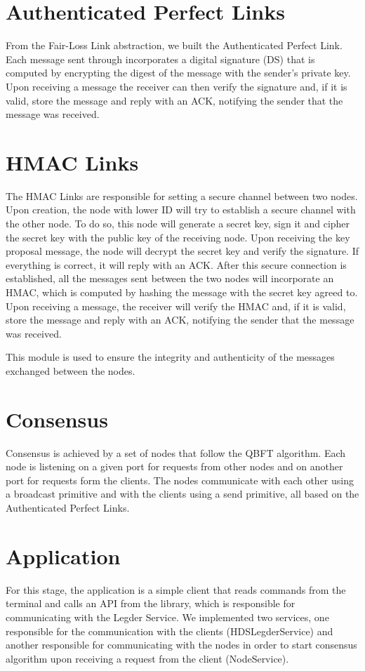 \documentclass{article}
\begin{document}
\section{Authenticated Perfect Links}
From the Fair-Loss Link abstraction, we built the Authenticated Perfect Link. Each message 
sent through incorporates a digital signature (DS) that is computed by encrypting the 
digest of the message with the sender's private key. Upon receiving a message the receiver 
can then verify the signature and, if it is valid, store the message and reply with an 
ACK, notifying the sender that the message was received.

\section{HMAC Links}
The HMAC Links are responsible for setting a secure channel between two nodes. Upon creation, 
the node with lower ID will try to establish a secure channel with the other node. To do so, 
this node will generate a secret key, sign it and cipher the secret key with the public key of 
the receiving node. Upon receiving the key proposal message, the node will decrypt the secret 
key and verify the signature. If everything is correct, it will reply with an ACK. After this 
secure connection is established, all the messages sent between the two nodes will incorporate 
an HMAC, which is computed by hashing the message with the secret key agreed to. Upon receiving 
a message, the receiver will verify the HMAC and, if it is valid, store the message and reply 
with an ACK, notifying the sender that the message was received.

This module is used to ensure the integrity and authenticity of the messages exchanged between 
the nodes.


\section{Consensus}
Consensus is achieved by a set of nodes that follow the QBFT algorithm. Each node is listening 
on a given port for requests from other nodes and on another port for requests form the clients. 
The nodes communicate with each other using a broadcast primitive and with the clients using a send 
primitive, all based on the Authenticated Perfect Links. 

\section{Application}
For this stage, the application is a simple client that reads commands from the terminal and calls 
an API from the library, which is responsible for communicating with the Legder Service. We implemented 
two services, one responsible for the communication with the clients (HDSLegderService) and another responsible 
for communicating with the nodes in order to start consensus algorithm upon receiving a request from the client 
(NodeService). 
\end{document}
